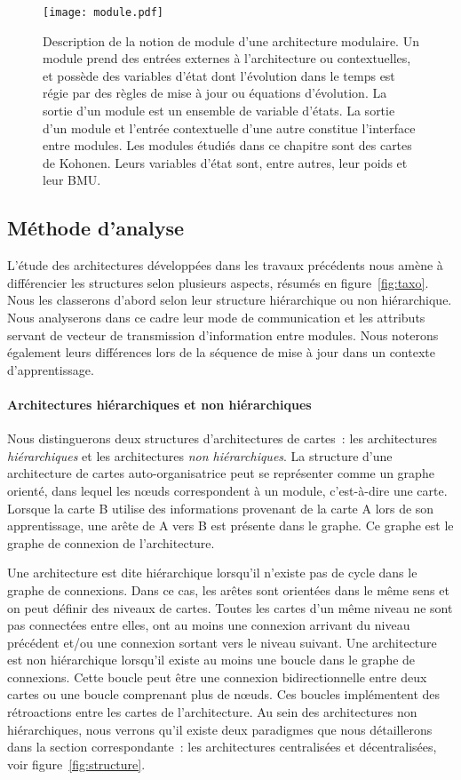 \documentclass[../main]{subfiles}
\begin{document}
\begin{figure}
    \centering
    \texttt{[image: module.pdf]}
    \caption{Description de la notion de module d'une architecture modulaire. Un module prend des entrées externes à l'architecture ou contextuelles, et possède des variables d'état dont l'évolution dans le temps est régie par des règles de mise à jour ou équations d'évolution. La sortie d'un module est un ensemble de variable d'états. La sortie d'un module et l'entrée contextuelle d'une autre constitue l'interface entre modules. Les modules étudiés dans ce chapitre sont des cartes de Kohonen. Leurs variables d'état sont, entre autres, leur poids et leur BMU.\label{fig:module}}
\end{figure}

\subsection{Méthode d'analyse}

L'étude des architectures développées dans les travaux précédents nous amène à différencier les structures selon plusieurs aspects, résumés en figure~\ref{fig:taxo}. Nous les classerons d'abord selon leur structure hiérarchique ou non hiérarchique.
Nous analyserons dans ce cadre leur mode de communication et les attributs servant de vecteur de transmission d'information entre modules. 
Nous noterons également leurs différences lors de la séquence de mise à jour dans un contexte d'apprentissage.

\paragraph{Architectures hiérarchiques et non hiérarchiques}

Nous distinguerons deux structures d'architectures de cartes~: les architectures \emph{hiérarchiques} et les architectures \emph{non hiérarchiques}.
La structure d'une architecture de cartes auto-organisatrice peut se représenter comme un graphe orienté, dans lequel les n\oe{}uds correspondent à un module, c'est-à-dire une carte. Lorsque la carte B utilise des informations provenant de la carte A lors de son apprentissage, une arête de A vers B est présente dans le graphe. Ce graphe est le graphe de connexion de l'architecture.

Une architecture est dite hiérarchique lorsqu'il n'existe pas de cycle dans le graphe de connexions. Dans ce cas, les arêtes sont orientées dans le même sens et on peut définir des niveaux de cartes. Toutes les cartes d'un même niveau ne sont pas connectées entre elles, ont au moins une connexion arrivant du niveau précédent et/ou une connexion sortant vers le niveau suivant.
Une architecture est non hiérarchique lorsqu'il existe au moins une boucle dans le graphe de connexions. Cette boucle peut être une connexion bidirectionnelle entre deux cartes ou une boucle comprenant plus de n\oe{}uds. Ces boucles implémentent des rétroactions entre les cartes de l'architecture.
Au sein des architectures non hiérarchiques, nous verrons qu'il existe deux paradigmes que nous détaillerons dans la section correspondante~: les architectures centralisées et décentralisées, voir figure~\ref{fig:structure}.
\end{document}
